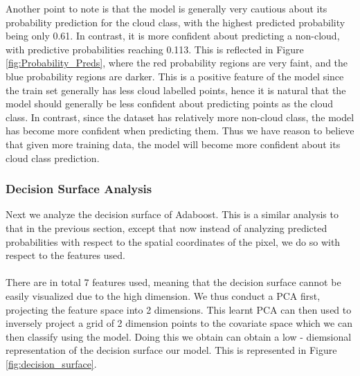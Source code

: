 \documentclass[11pt, letterpaper, journal]{IEEEtran}
\begin{document}
Another point to note is that the model is generally very cautious about its probability prediction for the cloud class, with the highest predicted probability being only 0.61. In contrast, it is more confident about predicting a non-cloud, with predictive probabilities reaching 0.113. This is reflected in Figure \ref{fig:Probability_Preds}, where the red probability regions are very faint, and the blue probability regions are darker. This is a positive feature of the model since the train set generally has less cloud labelled points, hence it is natural that the model should generally be less confident about predicting points as the cloud class. In contrast, since the dataset has relatively more non-cloud class, the model has become more confident when predicting them. Thus we have reason to believe that given more training data, the model will become more confident about its cloud class prediction.

\subsubsection{Decision Surface Analysis}
Next we analyze the decision surface of Adaboost. This is a similar analysis to that in the previous section, except that now instead of analyzing predicted probabilities with respect to the spatial coordinates of the pixel, we do so with respect to the features used. 
\\
\\
There are in total 7 features used, meaning that the decision surface cannot be easily visualized due to the high dimension. We thus conduct a PCA first, projecting the feature space into 2 dimensions. This learnt PCA can then used to inversely project a grid of 2 dimension points to the covariate space which we can then classify using the model. Doing this we obtain can obtain a low - diemsional representation of the decision surface our model. This is represented in Figure \ref{fig:decision_surface}. \\
\end{document}
